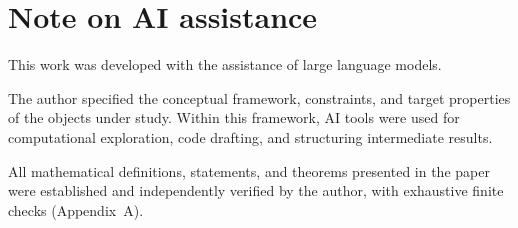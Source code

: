 \documentclass[11pt]{article}
\begin{document}
\section*{Note on AI assistance}

This work was developed with the assistance of large language models.

The author specified the conceptual framework, constraints, and target properties 
of the objects under study. Within this framework, AI tools were used for 
computational exploration, code drafting, and structuring intermediate results.

All mathematical definitions, statements, and theorems presented in the paper 
were established and independently verified by the author, with exhaustive 
finite checks (Appendix~A).



\end{document}
